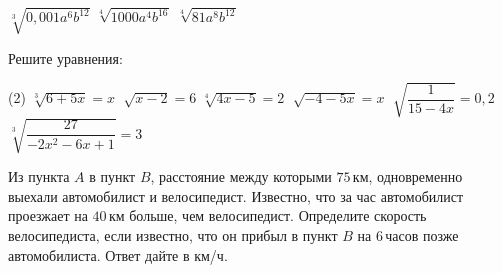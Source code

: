 \begin{class}[number=2]
\begin{listofex}
\begin{tasks}
			\task \( \sqrt[3]{ 0,001a^6b^{12} } \)
			\task \( \sqrt[4]{ 1000a^4b^{16} } \)
			\task \( \sqrt[4]{ 81a^8b^{12}} \)
		\end{tasks}
		\item Решите уравнения:
		\begin{tasks}(2)
			\task \( \sqrt[3]{6+5x} = x \)
			\task \( \sqrt[]{x-2}=6 \)
			\task \( \sqrt[4]{4x-5}=2 \)
			\task \( \sqrt[]{-4-5x}=x \)
			\task \( \sqrt[]{\dfrac{1}{15-4x}}=0,2 \)
			\task \( \sqrt[3]{\dfrac{27}{-2x^2-6x+1}}=3 \)
		\end{tasks}
		\item Из пункта \(A\) в пункт \(B\), расстояние между которыми \(75\) км, одновременно выехали автомобилист и велосипедист. Известно, что за час автомобилист проезжает на \(40\) км больше, чем велосипедист. Определите скорость велосипедиста, если известно, что он прибыл в пункт \(B\) на \(6\) часов позже автомобилиста. Ответ дайте в км/ч.
	\end{listofex}
\end{class}

